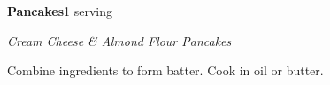 \documentclass[../recipe-collections/cooking.tex]{subfiles}
\begin{document}
\begin{recipe}{\textbf{Pancakes}}{1 serving}{}

  \freeform{}\textit{Cream Cheese \& Almond Flour Pancakes}

  
  Combine ingredients to form batter. Cook in oil or butter.

  \freeform{}\hrulefill{}

\end{recipe}
\end{document}
